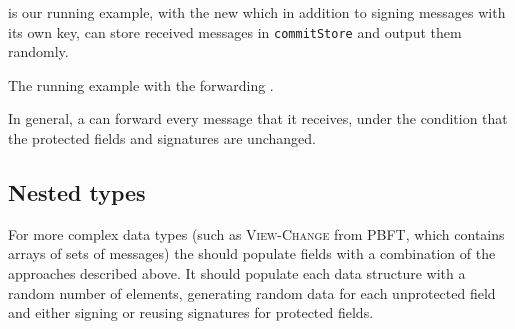  is our running example, with the new \randomHarness{} which in addition to signing messages with its own key, can store received messages in \texttt{commitStore} and output them randomly.

\begin{algorithm}
\caption{The running example with the forwarding \randomHarness{}.}
\label{alg:running-example-forwarding-harness}
\end{algorithm}

In general, a \randomSimulator{} can forward every message that it receives, under the condition that the protected fields and signatures are unchanged.


\subsection{Nested types}
\label{sec:certificate-channels-formalism}
For more complex data types (such as \textsc{View-Change} from PBFT, which contains arrays of sets of messages) the \randomHarness{} should populate fields with a combination of the approaches described above.
It should populate each data structure with a random number of elements, generating random data for each unprotected field and either signing or reusing signatures for protected fields.

